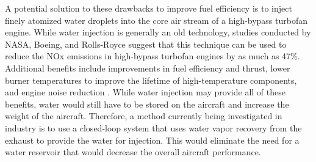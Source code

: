 \documentclass[conf]{new-aiaa}
\begin{document}

A potential solution to these drawbacks to improve fuel efficiency is to inject finely atomized water droplets into the core air stream of a high-bypass turbofan engine.
While water injection is generally an old technology, studies conducted by NASA, Boeing, and Rolls-Royce suggest that this technique can be used to reduce the NOx emissions in high-bypass turbofan engines by as much as 47\%.
Additional benefits include improvements in fuel efficiency and thrust, lower burner temperatures to improve the lifetime of high-temperature components, and engine noise reduction \cite{nasa_inject}.
While water injection may provide all of these benefits, water would still have to be stored on the aircraft and increase the weight of the aircraft.
Therefore, a method currently being investigated in industry is to use a closed-loop system that uses water vapor recovery from the exhaust to provide the water for injection.
This would eliminate the need for a water reservoir that would decrease the overall aircraft performance.
\end{document}

